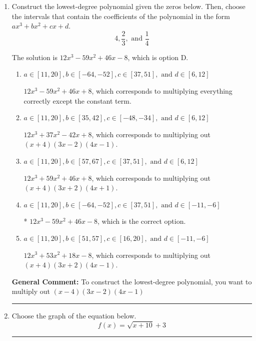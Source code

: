 \documentclass{extbook}[14pt]
\newcommand{\litem}[1]{\item #1

\rule{\textwidth}{0.4pt}}
\begin{document}
\begin{enumerate}\litem{
Construct the lowest-degree polynomial given the zeros below. Then, choose the intervals that contain the coefficients of the polynomial in the form $ax^3+bx^2+cx+d$.
\[ 4, \frac{2}{3}, \text{ and } \frac{1}{4} \]

The solution is \( 12x^{3} -59 x^{2} +46 x -8 \), which is option D.\begin{enumerate}[label=\Alph*.]
\item \( a \in [11, 20], b \in [-64, -52], c \in [37, 51], \text{ and } d \in [6, 12] \)

$12x^{3} -59 x^{2} +46 x + 8$, which corresponds to multiplying everything correctly except the constant term.
\item \( a \in [11, 20], b \in [35, 42], c \in [-48, -34], \text{ and } d \in [6, 12] \)

$12x^{3} +37 x^{2} -42 x + 8$, which corresponds to multiplying out $(x + 4)(3x -2)(4x -1)$.
\item \( a \in [11, 20], b \in [57, 67], c \in [37, 51], \text{ and } d \in [6, 12] \)

$12x^{3} +59 x^{2} +46 x + 8$, which corresponds to multiplying out $(x + 4)(3x + 2)(4x + 1)$.
\item \( a \in [11, 20], b \in [-64, -52], c \in [37, 51], \text{ and } d \in [-11, -6] \)

* $12x^{3} -59 x^{2} +46 x -8$, which is the correct option.
\item \( a \in [11, 20], b \in [51, 57], c \in [16, 20], \text{ and } d \in [-11, -6] \)

$12x^{3} +53 x^{2} +18 x -8$, which corresponds to multiplying out $(x + 4)(3x + 2)(4x -1)$.
\end{enumerate}

\textbf{General Comment:} To construct the lowest-degree polynomial, you want to multiply out $(x -4)(3x -2)(4x -1)$
}
\litem{
Choose the graph of the equation below.
\[ f(x) = \sqrt{x + 10} + 3 \]

}
\end{enumerate}
\end{document}
